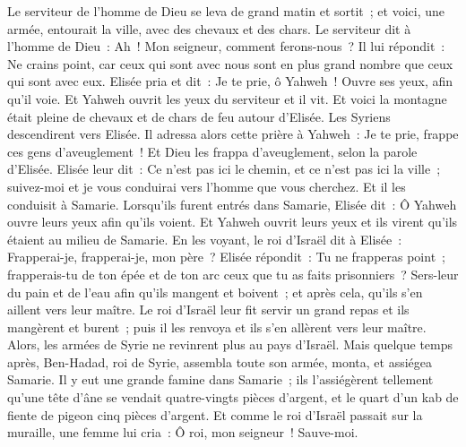\begin{multicols}{2}
Le serviteur de l'homme de Dieu se leva de grand matin et sortit~; et voici, une armée, entourait la ville, avec des chevaux et des chars. Le serviteur dit à l'homme de Dieu~: Ah~! Mon seigneur, comment ferons-nous~?
Il lui répondit~: Ne crains point, car ceux qui sont avec nous sont en plus grand nombre que ceux qui sont avec eux.
Elisée pria et dit~: Je te prie, ô Yahweh~! Ouvre ses yeux, afin qu'il voie. Et Yahweh ouvrit les yeux du serviteur et il vit. Et voici la montagne était pleine de chevaux et de chars de feu autour d'Elisée.
Les Syriens descendirent vers Elisée. Il adressa alors cette prière à Yahweh~: Je te prie, frappe ces gens d'aveuglement~! Et Dieu les frappa d'aveuglement, selon la parole d'Elisée.
Elisée leur dit~: Ce n'est pas ici le chemin, et ce n'est pas ici la ville~; suivez-moi et je vous conduirai vers l'homme que vous cherchez. Et il les conduisit à Samarie.
Lorsqu'ils furent entrés dans Samarie, Elisée dit~: Ô Yahweh ouvre leurs yeux afin qu'ils voient. Et Yahweh ouvrit leurs yeux et ils virent qu'ils étaient au milieu de Samarie.
En les voyant, le roi d'Israël dit à Elisée~: Frapperai-je, frapperai-je, mon père~?
Elisée répondit~: Tu ne frapperas point~; frapperais-tu de ton épée et de ton arc ceux que tu as faits prisonniers~? Sers-leur du pain et de l'eau afin qu'ils mangent et boivent~; et après cela, qu'ils s'en aillent vers leur maître.
Le roi d'Israël leur fit servir un grand repas et ils mangèrent et burent~; puis il les renvoya et ils s'en allèrent vers leur maître. Alors, les armées de Syrie ne revinrent plus au pays d'Israël.
Mais quelque temps après, Ben-Hadad, roi de Syrie, assembla toute son armée, monta, et assiégea Samarie.
Il y eut une grande famine dans Samarie~; ils l'assiégèrent tellement qu'une tête d'âne se vendait quatre-vingts pièces d'argent, et le quart d'un kab de fiente de pigeon cinq pièces d'argent.
Et comme le roi d'Israël passait sur la muraille, une femme lui cria~: Ô roi, mon seigneur~! Sauve-moi.

\end{multicols}
